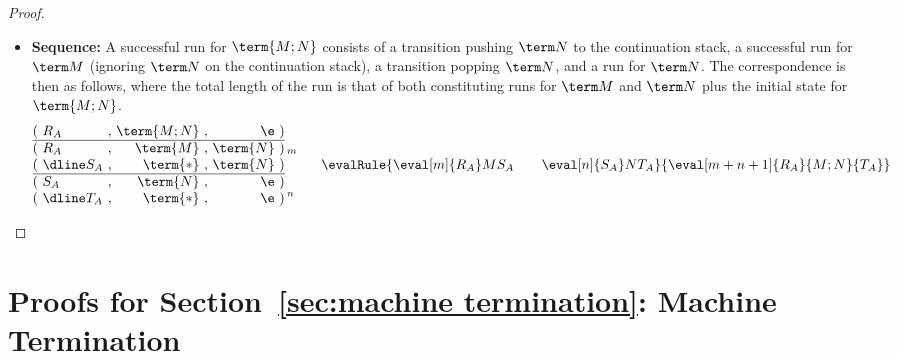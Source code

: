 \documentclass[a4paper,UKenglish,cleveref, autoref, thm-restate]{lipics-v2021}
\newcommand\case[1]{\textbf{#1}}
\begin{document}
\begin{proof}
\begin{itemize}
\item\case{Sequence:}
A successful run for $\term{M;N}$ consists of a transition pushing $\term N$ to the continuation stack, a successful run for $\term M$ (ignoring $\term N$ on the continuation stack), a transition popping $\term N$, and a run for $\term N$. The correspondence is then as follows, where the total length of the run is that of both constituting runs for $\term M$ and $\term N$ plus the initial state for $\term{M;N}$.
\[
\begin{array}{@{(~}l@{~,~}r@{~,~}r@{~)}l@{}}
          R_A & \term{M;N} & \e       
\\ \hline R_A & \term{M}   & \term{N} 
\\ \dline S_A & \term{*}   & \term{N} 
\\ \hline S_A & \term{N}   & \e       
\\ \dline T_A & \term{*}   & \e       
\end{array}
\,\raisebox{11pt}{\makebox[0pt][l]{$\scriptstyle m$}}
  \raisebox{-20pt}{$\scriptstyle n$}
\qquad
\evalRule {\eval[m]{R_A}M{S_A} \qquad \eval[n]{S_A}N{T_A}} {\eval[m+n+1]{R_A}{M;N}{T_A}}
\]
\end{itemize}
\end{proof}




\section{Proofs for Section~\ref{sec:machine termination}: Machine Termination}

\substitutionWeak*
\end{document}

